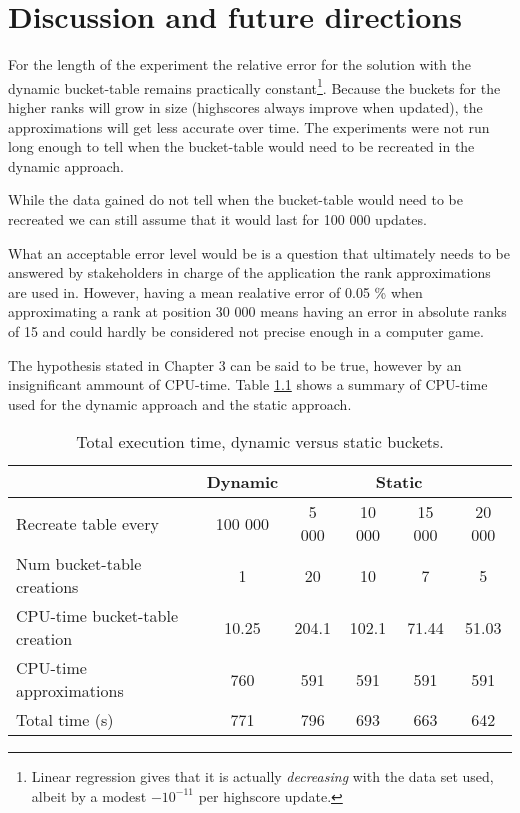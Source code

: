 \chapter{\label{discussion}Discussion and future directions}

For the length of the experiment the relative error for the solution with the dynamic bucket-table remains practically constant\footnote{Linear regression gives that it is actually \emph{decreasing} with the data set used, albeit by a modest $-10^{-11}$ per highscore update.}. Because the buckets for the higher ranks will grow in size (highscores always improve when updated), the approximations will get less accurate over time. The experiments were not run long enough to tell when the bucket-table would need to be recreated in the dynamic approach.

While the data gained do not tell when the bucket-table would need to be recreated we can still assume that it would last for 100 000 updates.



What an acceptable error level would be is a question that ultimately needs to be answered by stakeholders in charge of the application the rank approximations are used in. However, having a mean realative error of 0.05 \% when approximating a rank at position 30 000 means having an error in absolute ranks of 15 and could hardly be considered not precise enough in a computer game.

The hypothesis stated in Chapter 3 can be said to be true, however by an insignificant ammount of CPU-time. Table \ref{results} shows a summary of CPU-time used for the dynamic approach and the static approach. 

\begin{table}[h!]
\centering
\caption{Total execution time, dynamic versus static buckets.}
\label{results}
\vspace{4mm}
\begin{tabular}{l|c|cccc}

           & Dynamic                    & \multicolumn{4}{c}{Static}                                                       \\ \hline 
Recreate table every           & 100 000 & 5 000 & 10 000 & 15 000 & 20 000 \\
Num bucket-table creations     & 1                          & 20                       & 10                        & 7                         & 5                         \\ \hline
CPU-time bucket-table creation & 10.25                     & 204.1                    & 102.1                    & 71.44                    & 51.03                    \\
CPU-time approximations        & 760                    & 591 & 591 &591&591                      \\ \hline
Total time (s)                 & 771                    & 796                    & 693                    & 663                   & 642                  
\end{tabular}
\vspace{4mm}
\end{table}



